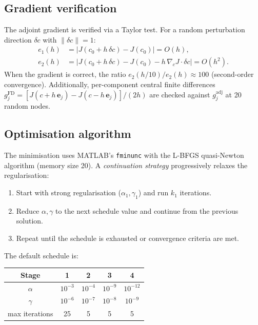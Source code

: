 \documentclass[a4paper,11pt,fleqn]{article}
\newcommand{\ve}[1]{\boldsymbol{#1}}
\begin{document}
\subsection{Gradient verification}
\label{sec:taylor_test}

The adjoint gradient is verified via a Taylor test. For a random perturbation direction $\delta c$ with $\|\delta c\| = 1$:
\begin{align}
    e_1(h) &= |J(c_0 + h\,\delta c) - J(c_0)| = O(h), \\
    e_2(h) &= |J(c_0 + h\,\delta c) - J(c_0) - h\,\nabla_c J \cdot \delta c| = O(h^2).
\end{align}
When the gradient is correct, the ratio $e_2(h/10)/e_2(h) \approx 100$ (second-order convergence). Additionally, per-component central finite differences $g_j^{\mathrm{FD}} = [J(c + h\,\ve{e}_j) - J(c - h\,\ve{e}_j)]/(2h)$ are checked against $g_j^{\mathrm{adj}}$ at 20 random nodes.

\subsection{Optimisation algorithm}
\label{sec:optimisation}

The minimisation uses MATLAB's \texttt{fminunc} with the L-BFGS quasi-Newton algorithm (memory size 20). A \emph{continuation strategy} progressively relaxes the regularisation:
\begin{enumerate}
    \item Start with strong regularisation ($\alpha_1, \gamma_1$) and run $k_1$ iterations.
    \item Reduce $\alpha, \gamma$ to the next schedule value and continue from the previous solution.
    \item Repeat until the schedule is exhausted or convergence criteria are met.
\end{enumerate}

The default schedule is:
\begin{center}
\begin{tabular}{c|cccc}
    Stage & 1 & 2 & 3 & 4 \\ \hline
    $\alpha$ & $10^{-3}$ & $10^{-4}$ & $10^{-9}$ & $10^{-12}$ \\
    $\gamma$ & $10^{-6}$ & $10^{-7}$ & $10^{-8}$ & $10^{-9}$ \\
    max iterations & 25 & 5 & 5 & 5 \\
\end{tabular}
\end{center}
\end{document}
